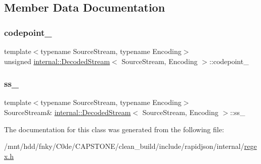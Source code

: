 \subsection{Member Data Documentation}
\mbox{\label{classinternal_1_1DecodedStream_ab2d66695cea627ac0b2a53a5ff8d5526}} 
\subsubsection{\texorpdfstring{codepoint\+\_\+}{codepoint\_}}
{\footnotesize\ttfamily template$<$typename Source\+Stream, typename Encoding$>$ \\
unsigned \hyperlink{classinternal_1_1DecodedStream}{internal\+::\+Decoded\+Stream}$<$ Source\+Stream, Encoding $>$\+::codepoint\+\_\+\hspace{0.3cm}{\ttfamily [private]}}

\mbox{\label{classinternal_1_1DecodedStream_ac87f823c7c950f13145dc3c151dcf714}} 
\subsubsection{\texorpdfstring{ss\+\_\+}{ss\_}}
{\footnotesize\ttfamily template$<$typename Source\+Stream, typename Encoding$>$ \\
Source\+Stream\& \hyperlink{classinternal_1_1DecodedStream}{internal\+::\+Decoded\+Stream}$<$ Source\+Stream, Encoding $>$\+::ss\+\_\+\hspace{0.3cm}{\ttfamily [private]}}



The documentation for this class was generated from the following file\+:\begin{DoxyCompactItemize}
\item 
/mnt/hdd/fnky/\+C0de/\+C\+A\+P\+S\+T\+O\+N\+E/clean\+\_\+build/include/rapidjson/internal/\hyperlink{regex_8h}{regex.\+h}\end{DoxyCompactItemize}
